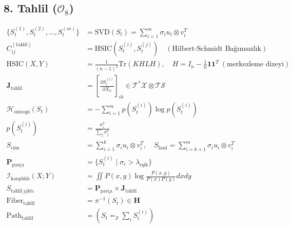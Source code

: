 \documentclass[11pt, a4paper]{article}
\begin{document}
\subsection{8. Tahlil ($\mathcal{O}_8$)}
\begin{align}
\{S_t^{(1)}, S_t^{(2)}, \dots, S_t^{(m)}\} &= \text{SVD}(S_t) = \sum_{i=1}^m \sigma_i u_i \otimes v_i^T \\
C_{ij}^{(\text{tahlil})} &= \text{HSIC}(S_t^{(i)}, S_t^{(j)}) \quad (\text{Hilbert-Schmidt Bağımsızlık}) \\
\text{HSIC}(X, Y) &= \frac{1}{(n-1)^2} \text{Tr}(K H L H), \quad H = I_n - \tfrac{1}{n}\mathbf{1}\mathbf{1}^T \ (\text{merkezleme dizeyi}) \\
\mathbf{J}_{\text{tahlil}} &= \left[ \frac{\partial S_t^{(i)}}{\partial X_k} \right]_{ik} \in \mathcal{T}^*\mathcal{X} \otimes \mathcal{T}\mathcal{S} \\
\mathcal{H}_{\text{entropi}}(S_t) &= -\sum_{i=1}^m p(S_t^{(i)}) \log p(S_t^{(i)}) \\
p(S_t^{(i)}) &= \frac{\sigma_i^2}{\sum_j \sigma_j^2} \\
S_{\text{cins}} &= \sum_{i=1}^k \sigma_i u_i \otimes v_i^T, \quad S_{\text{fasıl}} = \sum_{i=k+1}^m \sigma_i u_i \otimes v_i^T \\
\mathbf{P}_{\text{parça}} &= \{ S_t^{(i)} \mid \sigma_i > \lambda_{\text{eşik}} \} \\
\mathcal{I}_{\text{karşılıklı}}(X; Y) &= \iint P(x, y) \log \frac{P(x, y)}{P(x)P(y)} dx dy \\
S_{\text{tahlil\_çıktı}} &= \mathbf{P}_{\text{parça}} \times \mathbf{J}_{\text{tahlil}} \\
\text{Fiber}_{\text{tahlil}} &= \pi^{-1}(S_t) \in \mathbf{H} \\
\text{Path}_{\text{tahlil}} &= (S_t =_{\mathcal{S}} \sum_i S_t^{(i)})
\end{align}
\end{document}
